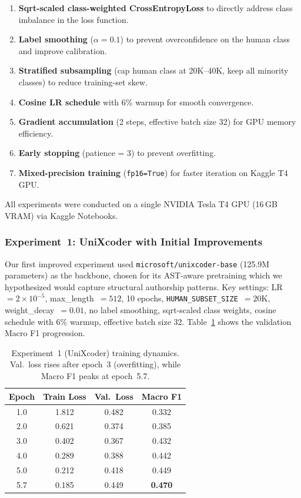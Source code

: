 \documentclass[11pt]{article}
\begin{document}
\begin{enumerate}
    \item \textbf{Sqrt-scaled class-weighted CrossEntropyLoss} to directly address class imbalance in the loss function.
    \item \textbf{Label smoothing} ($\alpha = 0.1$) to prevent overconfidence on the human class and improve calibration.
    \item \textbf{Stratified subsampling} (cap human class at 20K--40K, keep all minority classes) to reduce training-set skew.
    \item \textbf{Cosine LR schedule} with 6\% warmup for smooth convergence.
    \item \textbf{Gradient accumulation} (2 steps, effective batch size 32) for GPU memory efficiency.
    \item \textbf{Early stopping} (patience = 3) to prevent overfitting.
    \item \textbf{Mixed-precision training} (\texttt{fp16=True}) for faster iteration on Kaggle T4 GPU.
\end{enumerate}

All experiments were conducted on a single NVIDIA Tesla T4 GPU (16\,GB VRAM) via Kaggle Notebooks.

\subsubsection{Experiment~1: UniXcoder with Initial Improvements}

Our first improved experiment used \texttt{microsoft/unixcoder-base} (125.9M parameters) as the backbone, chosen for its AST-aware pretraining which we hypothesized would capture structural authorship patterns.
Key settings: LR~$= 2{\times}10^{-5}$, max\_length~$= 512$, 10 epochs, \texttt{HUMAN\_SUBSET\_SIZE}~$= 20\text{K}$, weight\_decay~$= 0.01$, no label smoothing, sqrt-scaled class weights, cosine schedule with 6\% warmup, effective batch size 32.
Table~\ref{tab:taskB_exp1_progress} shows the validation Macro F1 progression.

\begin{table}[htbp]
\centering
\footnotesize
\begin{tabularx}{\columnwidth}{@{}c c c c@{}}
\toprule
\textbf{Epoch} & \textbf{Train Loss} & \textbf{Val.\ Loss} & \textbf{Macro F1} \\ \midrule
1.0 & 1.812 & 0.482 & 0.332 \\
2.0 & 0.621 & 0.374 & 0.385 \\
3.0 & 0.402 & 0.367 & 0.432 \\
4.0 & 0.289 & 0.388 & 0.442 \\
5.0 & 0.212 & 0.418 & 0.449 \\
5.7 & 0.185 & 0.449 & \textbf{0.470} \\
\bottomrule
\end{tabularx}
\caption{Experiment~1 (UniXcoder) training dynamics. Val.\ loss rises after epoch~3 (overfitting), while Macro F1 peaks at epoch~5.7.}
\label{tab:taskB_exp1_progress}
\end{table}
\end{document}
